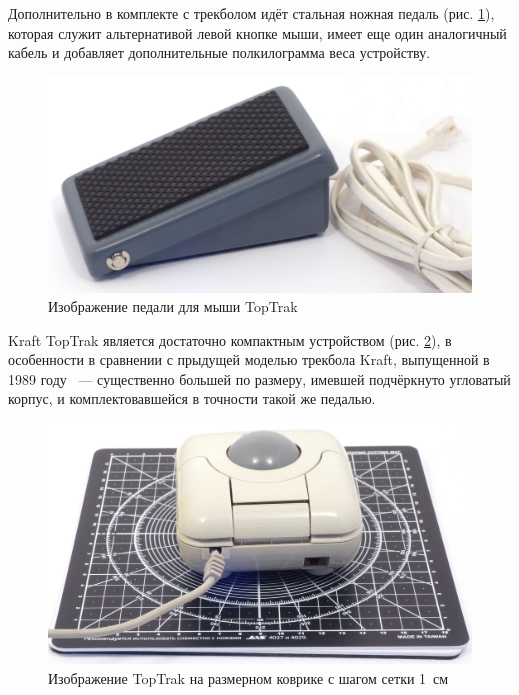 \documentclass[11pt, a4paper]{article}
\begin{document}
Дополнительно в комплекте с трекболом идёт стальная ножная педаль (рис. \ref{fig:TopTrakPedal}), которая служит альтернативой левой кнопке мыши, имеет еще один аналогичный кабель и добавляет дополнительные полкилограмма веса устройству.

\begin{figure}[h]
    \centering
    \includegraphics[scale=0.45]{1990_kraft_toptrack/pedal_30.jpg}
    \caption{Изображение педали для мыши TopTrak}
    \label{fig:TopTrakPedal}
\end{figure}


Kraft TopTrak является достаточно компактным устройством (рис. \ref{fig:TopTrakSize}), в особенности в сравнении с прыдущей моделью трекбола Kraft, выпущенной в 1989 году ~--- существенно большей по размеру, имевшей подчёркнуто угловатый корпус, и комплектовавшейся в точности такой же педалью.

\begin{figure}[h]
    \centering
    \includegraphics[scale=0.35]{1990_kraft_toptrack/2.6_30.jpg}
    \caption{Изображение TopTrak на размерном коврике с шагом сетки 1~см}
    \label{fig:TopTrakSize}
\end{figure}
\end{document}
